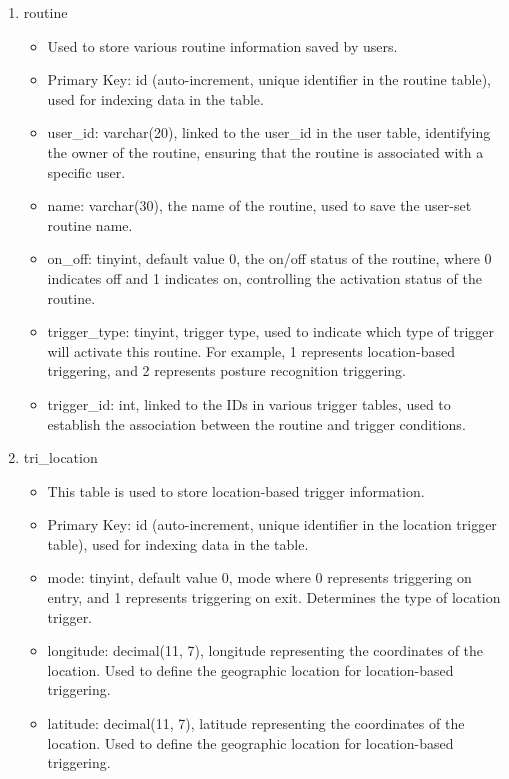 \begin{enumerate}
\begin{enumerate}
              \item routine
                    \begin{itemize}
                        \item Used to store various routine information saved by users.
                        \item Primary Key: id (auto-increment, unique identifier in the routine table), used for indexing data in the table.
                        \item user\_id: varchar(20), linked to the user\_id in the user table, identifying the owner of the routine, ensuring that the routine is associated with a specific user.
                        \item name: varchar(30), the name of the routine, used to save the user-set routine name.
                        \item on\_off: tinyint, default value 0, the on/off status of the routine, where 0 indicates off and 1 indicates on, controlling the activation status of the routine.
                        \item trigger\_type: tinyint, trigger type, used to indicate which type of trigger will activate this routine. For example, 1 represents location-based triggering, and 2 represents posture recognition triggering.
                        \item trigger\_id: int, linked to the IDs in various trigger tables, used to establish the association between the routine and trigger conditions.\\
                    \end{itemize}

              \item tri\_location
                    \begin{itemize}
                        \item This table is used to store location-based trigger information.
                        \item Primary Key: id (auto-increment, unique identifier in the location trigger table), used for indexing data in the table.
                        \item mode: tinyint, default value 0, mode where 0 represents triggering on entry, and 1 represents triggering on exit. Determines the type of location trigger.
                        \item longitude: decimal(11, 7), longitude representing the coordinates of the location. Used to define the geographic location for location-based triggering.
                        \item latitude: decimal(11, 7), latitude representing the coordinates of the location. Used to define the geographic location for location-based triggering.\\
                    \end{itemize}


\end{enumerate}
\end{enumerate}
